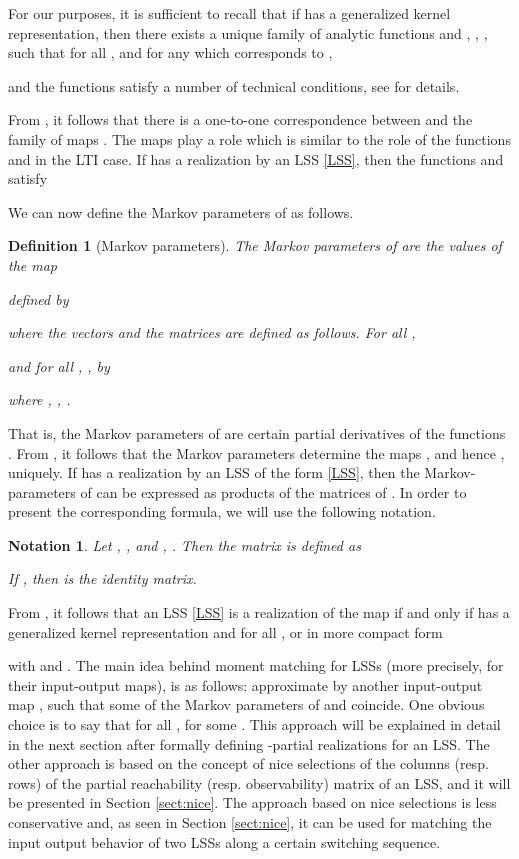 \documentclass[journal]{IEEEtran}
\newtheorem{Definition}{Definition}
\newtheorem{Notation}{Notation}
\begin{document}
For our purposes, it is sufficient to recall that if  has a generalized kernel representation, then there exists a unique family of analytic functions  and , , , such that for all ,  and for any  which corresponds to ,

and the functions  satisfy a number of technical conditions, see \cite[Definition 19]{MP:BigArticlePartI} for details.

From \cite{MP:BigArticlePartI}, it follows that there is a one-to-one correspondence between  and the family of maps . The maps  play a role which is similar to the role of the functions  and  in the LTI case. If  has a realization by an LSS \eqref{LSS}, then the functions  and  satisfy

We can now define the Markov parameters of  as follows.

\begin{Definition}[Markov parameters] \label{MarkovParameters}
	The Markov parameters of  are the values of the map
	
	defined by
	
	where the vectors  and the matrices  are defined as follows. For all ,
	
	and for all , ,  by
	
	where , , .
\end{Definition}

That is, the Markov parameters of  are certain partial derivatives of the functions . From \cite{MP:BigArticlePartI}, it follows that the Markov parameters  determine the maps , and hence , uniquely.
If  has a realization by an LSS  of the form \eqref{LSS}, then the Markov-parameters of  can be expressed as products of the matrices of . In order to present the corresponding formula, we will use the following notation.

\begin{Notation} \label{Notation2}
	Let , ,  and , . Then the matrix  is defined as
	
	If , then  is the identity matrix.
\end{Notation}



From \cite{MP:BigArticlePartI}, it follows that an LSS \eqref{LSS} is a realization of the map  if and only if  has a generalized kernel representation and  for all , or in more compact form

with  and .
The main idea behind moment matching for LSSs (more precisely, for their input-output maps), is as follows: approximate  by another input-output map , such that some of the Markov parameters of  and  coincide. One obvious choice is to say that  for all ,  for some . This approach will be explained in detail in the next section after formally defining -partial realizations for an LSS. The other approach is based on the concept of nice selections of the columns (resp. rows) of the partial reachability (resp. observability) matrix of an LSS, and it will be presented in Section \ref{sect:nice}. The approach based on nice selections is less conservative and, as seen in Section \ref{sect:nice}, it can be used for matching the input output behavior of two LSSs along a certain switching sequence.
\end{document}
